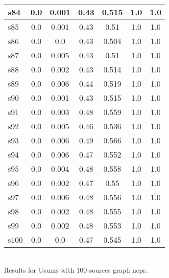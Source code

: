 \documentclass{article}
\begin{document}
\begin{tabular}{|l|c|c|c|c|c|c|}
\hline
s84 &0.0 & 0.001 & 0.43 & 0.515 & 1.0 & 1.0\\
\hline
s85 &0.0 & 0.001 & 0.43 & 0.51 & 1.0 & 1.0\\
\hline
s86 &0.0 & 0.0 & 0.43 & 0.504 & 1.0 & 1.0\\
\hline
s87 &0.0 & 0.005 & 0.43 & 0.51 & 1.0 & 1.0\\
\hline
s88 &0.0 & 0.002 & 0.43 & 0.514 & 1.0 & 1.0\\
\hline
s89 &0.0 & 0.006 & 0.44 & 0.519 & 1.0 & 1.0\\
\hline
s90 &0.0 & 0.001 & 0.43 & 0.515 & 1.0 & 1.0\\
\hline
s91 &0.0 & 0.003 & 0.48 & 0.559 & 1.0 & 1.0\\
\hline
s92 &0.0 & 0.005 & 0.46 & 0.536 & 1.0 & 1.0\\
\hline
s93 &0.0 & 0.006 & 0.49 & 0.566 & 1.0 & 1.0\\
\hline
s94 &0.0 & 0.006 & 0.47 & 0.552 & 1.0 & 1.0\\
\hline
s95 &0.0 & 0.004 & 0.48 & 0.558 & 1.0 & 1.0\\
\hline
s96 &0.0 & 0.002 & 0.47 & 0.55 & 1.0 & 1.0\\
\hline
s97 &0.0 & 0.006 & 0.48 & 0.556 & 1.0 & 1.0\\
\hline
s98 &0.0 & 0.002 & 0.48 & 0.555 & 1.0 & 1.0\\
\hline
s99 &0.0 & 0.002 & 0.48 & 0.553 & 1.0 & 1.0\\
\hline
s100 &0.0 & 0.0 & 0.47 & 0.545 & 1.0 & 1.0\\
\hline
\end{tabular}\\

\noindent Results for Usums with 100 sources graph ncpr.
\end{document}
